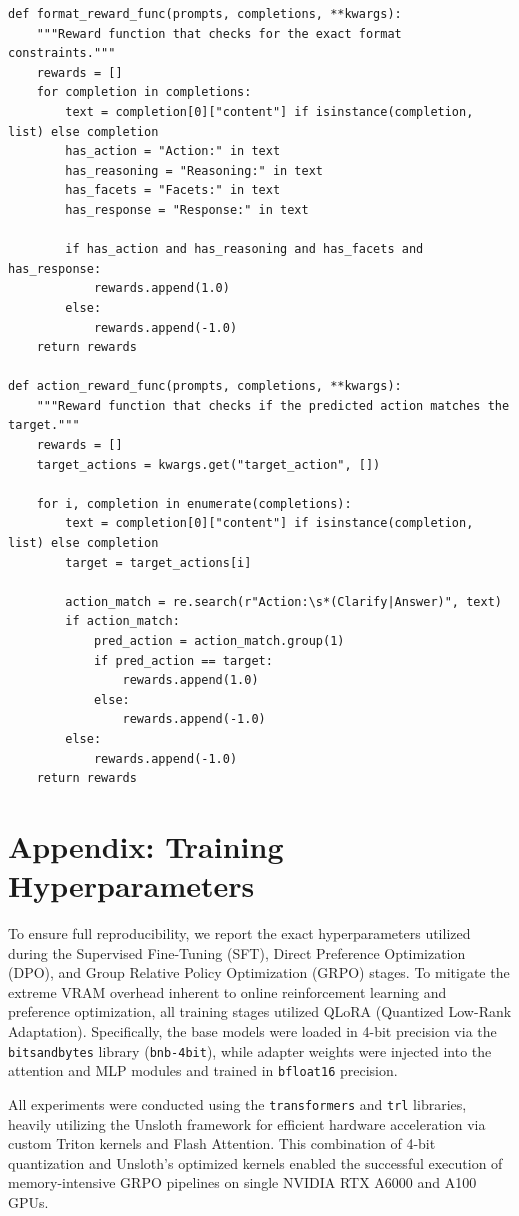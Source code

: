 \documentclass{article}
\theoremstyle{plain}
\theoremstyle{definition}
\theoremstyle{remark}
\begin{document}
\begin{verbatim}
def format_reward_func(prompts, completions, **kwargs):
    """Reward function that checks for the exact format constraints."""
    rewards = []
    for completion in completions:
        text = completion[0]["content"] if isinstance(completion, list) else completion
        has_action = "Action:" in text
        has_reasoning = "Reasoning:" in text
        has_facets = "Facets:" in text
        has_response = "Response:" in text

        if has_action and has_reasoning and has_facets and has_response:
            rewards.append(1.0)
        else:
            rewards.append(-1.0)
    return rewards

def action_reward_func(prompts, completions, **kwargs):
    """Reward function that checks if the predicted action matches the target."""
    rewards = []
    target_actions = kwargs.get("target_action", [])

    for i, completion in enumerate(completions):
        text = completion[0]["content"] if isinstance(completion, list) else completion
        target = target_actions[i]

        action_match = re.search(r"Action:\s*(Clarify|Answer)", text)
        if action_match:
            pred_action = action_match.group(1)
            if pred_action == target:
                rewards.append(1.0)
            else:
                rewards.append(-1.0)
        else:
            rewards.append(-1.0)
    return rewards
\end{verbatim}

\section{Appendix: Training Hyperparameters}
\label{sec:hyperparams}
To ensure full reproducibility, we report the exact hyperparameters utilized during the Supervised Fine-Tuning (SFT), Direct Preference Optimization (DPO), and Group Relative Policy Optimization (GRPO) stages. To mitigate the extreme VRAM overhead inherent to online reinforcement learning and preference optimization, all training stages utilized QLoRA (Quantized Low-Rank Adaptation). Specifically, the base models were loaded in 4-bit precision via the \texttt{bitsandbytes} library (\texttt{bnb-4bit}), while adapter weights were injected into the attention and MLP modules and trained in \texttt{bfloat16} precision. 

All experiments were conducted using the \texttt{transformers} and \texttt{trl} libraries, heavily utilizing the Unsloth framework for efficient hardware acceleration via custom Triton kernels and Flash Attention. This combination of 4-bit quantization and Unsloth's optimized kernels enabled the successful execution of memory-intensive GRPO pipelines on single NVIDIA RTX A6000 and A100 GPUs.
\end{document}
